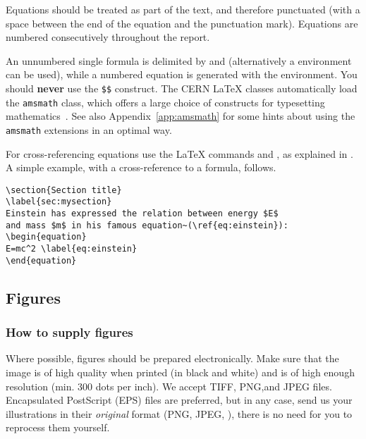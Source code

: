 \documentclass{cernrep}
\begin{document}
Equations should be treated as part of the text, and therefore
punctuated (with a space between the end of the equation and the
punctuation mark).  Equations are numbered consecutively throughout
the report. 

An unnumbered single formula is delimited by \Lcs{[} and \Lcs{]}
(alternatively a  environment can be used), while a
numbered equation is generated with the  environment.
You should \textbf{never} use the \texttt{\$\$} construct.  The CERN
\LaTeX{} classes automatically load the \texttt{amsmath} class, which
offers a large choice of constructs for typesetting
mathematics~\cite{bib:voss2005}. See also Appendix~\ref{app:amsmath}
for some hints about using the \texttt{amsmath} extensions in an
optimal way.

For cross-referencing equations use the \LaTeX{} commands 
and , as explained in .
A simple example, with a cross-reference to a formula, follows.

\begin{verbatim}
\section{Section title}
\label{sec:mysection}
Einstein has expressed the relation between energy $E$ 
and mass $m$ in his famous equation~(\ref{eq:einstein}):
\begin{equation}
E=mc^2 \label{eq:einstein}
\end{equation}
\end{verbatim}

\subsection{Figures}
\label{sec:figures}

\subsubsection{How to supply figures}

Where possible, figures should be prepared electronically.  Make sure
that the image is of high quality when printed (in black and white)
and is of high enough resolution (min. 300 dots per inch). We accept
TIFF, PNG,and JPEG files. Encapsulated PostScript (EPS) files
are preferred, but in any case, send us your illustrations in their
\emph{original} format (PNG, JPEG, \etc), there is no need for you to
reprocess them yourself.
\end{document}
